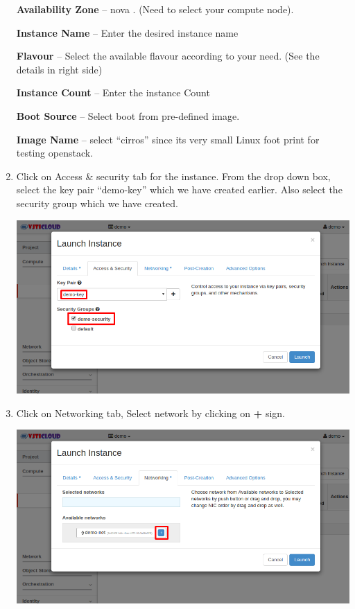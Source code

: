 \documentclass[letterpaper,10pt,english]{sphinxmanual}
\begin{document}
\begin{enumerate}
\textbf{Availability Zone} – nova .  (Need to select your compute node).

\textbf{Instance Name} – Enter the desired instance name

\textbf{Flavour} – Select the available flavour according  to your need. (See the details in right side)

\textbf{Instance Count} –  Enter the instance Count

\textbf{Boot Source} – Select boot from pre-defined image.

\textbf{Image Name} – select “cirros” since its very small Linux foot print for testing openstack.

\item {} 
Click on Access \& security tab for the instance. From the drop down box, select the key pair “demo-key” which we have created earlier. Also select the security group which we have created.

\includegraphics{instances-launch-access&security.png}

\item {} 
Click on Networking tab, Select network by clicking on \textbf{+} sign.

\includegraphics{instances-launch-networking.png}


\end{enumerate}
\end{document}
